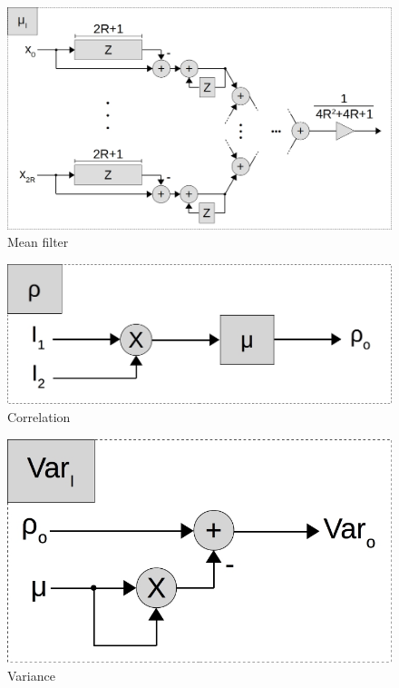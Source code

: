 \begin{figure}[ht!]
  \centering
  \includegraphics[scale=0.3]{figures/mean}
  \caption{Mean filter}
  \label{fig:mean}
\end{figure}

\begin{figure}[ht!]
  \centering
  \includegraphics[scale=0.3]{figures/rho}
  \caption{Correlation}
  \label{fig:rho}
\end{figure}

\begin{figure}[ht!]
  \centering
  \includegraphics[scale=0.3]{figures/var_par}
  \caption{Variance}
  \label{fig:var_par}
\end{figure}

